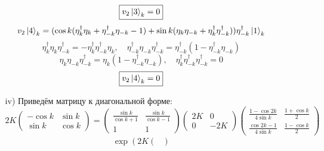 \documentclass[12pt]{article}
\theoremstyle{definition}
\begin{document}
\begin{enumerate}
\begin{itemize}
\begin{equation}
        \end{equation}
        \begin{equation}
            \boxed{v_2\ket{3}_k=0}
        \end{equation}
        \begin{equation}
            v_2\ket{4}_k=(\cos k(\eta^\dagger_k\eta_k+\eta^\dagger_{-k}\eta_{-k}-1)+\sin k(\eta_k\eta_{-k}+\eta^\dagger_k\eta_{-k}^\dagger))\eta^\dagger_{-k}\ket{1}_k
        \end{equation}
        \begin{equation}
            \eta^\dagger_k\eta_k\eta^\dagger_{-k}=-\eta^\dagger_k\eta^\dagger_{-k}\eta_k,\quad\eta^\dagger_{-k}\eta_{-k}\eta^\dagger_{-k}=\eta^\dagger_{-k}(1-\eta^\dagger_{-k}\eta_{-k})
        \end{equation}
        \begin{equation}
            \eta_k\eta_{-k}\eta^\dagger_{-k}=\eta_k(1-\eta^\dagger_{-k}\eta_{-k}),\quad\eta^\dagger_k\eta_{-k}^\dagger\eta^\dagger_{-k}=0
        \end{equation}
        \begin{equation}
            \boxed{v_2\ket{4}_k=0}
        \end{equation}
        \item[iv)] Приведём матрицу к диагональной форме:
        \begin{equation}
            2K\begin{pmatrix}
                -\cos k &\sin k\\
                \sin k & \cos k
            \end{pmatrix}=\begin{pmatrix}
                \frac{\sin k}{\cos k+1} & \frac{\sin k}{\cos k-1}\\
                1 & 1
            \end{pmatrix}\begin{pmatrix}
                2K & 0\\
                0 & -2K
            \end{pmatrix}\begin{pmatrix}
                \frac{1-\cos2k}{4\sin k} & \frac{1+\cos k}{2}\\
                \frac{\cos2k-1}{4\sin k} & \frac{1-\cos k}{2}
            \end{pmatrix}
        \end{equation}
        \begin{multline}
            \exp\left(2K\begin{pmatrix}

\end{pmatrix}
\end{multline}
\end{itemize}
\end{enumerate}
\end{document}
